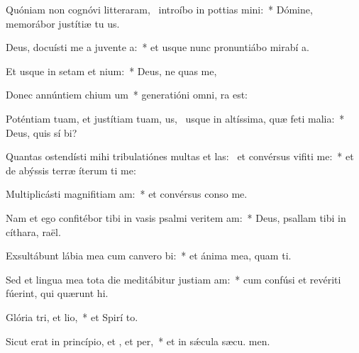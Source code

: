 \item Quóniam non cognóvi litteraram,~\pscross{} introíbo in pottias mini:~* Dómine, memorábor justítiæ tu us.
\item Deus, docuísti me a juvente a:~* et usque nunc pronuntiábo mirabí a.
\item Et usque in setam et nium:~* Deus, ne quas me,
\item Donec annúntiem chium um~* generatióni omni,  ra est:
\item Poténtiam tuam, et justítiam tuam, us,~\pscross{} usque in altíssima, quæ feti malia:~* Deus, quis sí bi?
\item Quantas ostendísti mihi tribulatiónes multas et las:~\pscross{} et convérsus vifiti me:~* et de abýssis terræ íterum ti me:
\item Multiplicásti magnifitiam am:~* et convérsus conso  me.
\item Nam et ego confitébor tibi in vasis psalmi veritem am:~* Deus, psallam tibi in cíthara,  raël.
\item Exsultábunt lábia mea cum canvero bi:~* et ánima mea, quam ti.
\item Sed et lingua mea tota die meditábitur justiam am:~* cum confúsi et revériti fúerint, qui quærunt  hi.
\item Glória tri, et lio,~* et Spirí to.
\item Sicut erat in princípio, et , et per,~* et in sǽcula sæcu. men.
